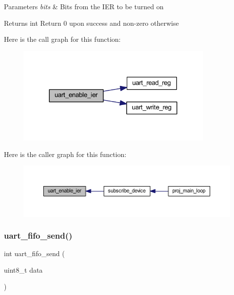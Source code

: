 \begin{DoxyParams}{Parameters}
{\em bits} & Bits from the I\+ER to be turned on \\
\hline
\end{DoxyParams}
\begin{DoxyReturn}{Returns}
int Return 0 upon success and non-\/zero otherwise 
\end{DoxyReturn}
Here is the call graph for this function\+:\nopagebreak
\begin{figure}[H]
\begin{center}
\leavevmode
\includegraphics[width=276pt]{group__uart_gac9c7676f3d9f44d09e85ab65aa9e9d59_cgraph}
\end{center}
\end{figure}
Here is the caller graph for this function\+:\nopagebreak
\begin{figure}[H]
\begin{center}
\leavevmode
\includegraphics[width=350pt]{group__uart_gac9c7676f3d9f44d09e85ab65aa9e9d59_icgraph}
\end{center}
\end{figure}
\mbox{\label{group__uart_ga583930d9069e797391526134f24113ce}} 
\subsubsection{\texorpdfstring{uart\+\_\+fifo\+\_\+send()}{uart\_fifo\_send()}}
{\footnotesize\ttfamily int uart\+\_\+fifo\+\_\+send (\begin{DoxyParamCaption}\item[{uint8\+\_\+t}]{data }\end{DoxyParamCaption})}




